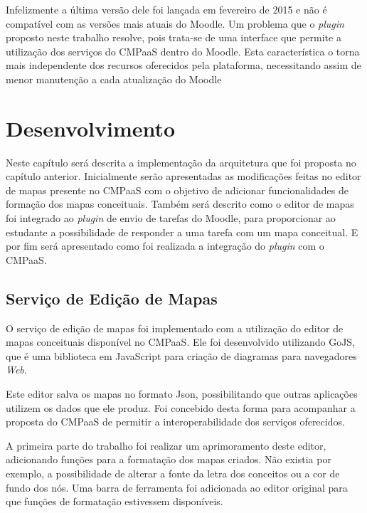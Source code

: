 \documentclass[
	12pt,				%
	openright,			%
	oneside,			%
	a4paper,			%
	english,			%
	french,				%
	spanish,			%
	brazil				%
	]{abntex2}
\begin{document}
Infelizmente a última versão dele foi lançada em fevereiro de 2015 e não é compatível com as versões mais atuais do Moodle. Um problema que o \textit{plugin} proposto neste trabalho resolve, pois trata-se de uma interface que permite a utilização dos serviços do CMPaaS dentro do Moodle. Esta característica o torna mais independente dos recursos oferecidos pela plataforma, necessitando assim de menor manutenção a cada atualização do Moodle  



\chapter{Desenvolvimento}

Neste capítulo será descrita a implementação da arquitetura que foi proposta no capítulo anterior. Inicialmente serão apresentadas as modificações feitas no editor de mapas presente no CMPaaS com o objetivo de adicionar funcionalidades de formação dos mapas conceituais. Também será descrito como o editor de mapas foi integrado ao \textit{plugin} de envio de tarefas do Moodle, para proporcionar ao estudante a possibilidade de responder a uma tarefa com um mapa conceitual. E por fim será apresentado como foi realizada a integração do \textit{plugin} com o CMPaaS. 

\section{Serviço de Edição de Mapas}
O serviço de edição de mapas foi implementado com a utilização do editor de mapas conceituais disponível no CMPaaS. Ele foi desenvolvido utilizando GoJS, que é uma biblioteca em JavaScript para criação de diagramas para navegadores \textit{Web}.

Este editor salva os mapas no formato Json, possibilitando que outras aplicações utilizem os dados que ele produz. Foi concebido desta forma para acompanhar a proposta do CMPaaS de permitir a interoperabilidade dos serviços oferecidos.

A primeira parte do trabalho foi realizar um aprimoramento deste editor, adicionando funções para a formatação dos mapas criados. Não existia por exemplo, a possibilidade de alterar a fonte da letra dos conceitos ou a cor de fundo dos nós. Uma barra de ferramenta foi adicionada ao editor original para que funções de formatação estivessem disponíveis.
\end{document}
